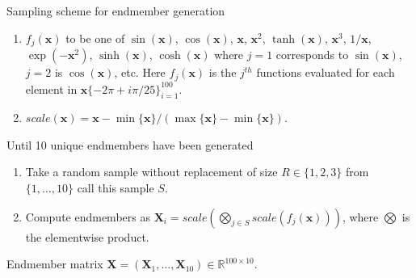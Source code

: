 \documentclass{article}
\numberwithin{equation}{section}
\theoremstyle{plain}
\begin{document}
\begin{algorithm}[tb]
   \caption{Sampling scheme for endmember generation}
   \label{ALG:EGEN}
\begin{algorithmic} 
   \begin{enumerate}
     \item  $f_j(\mathbf{x})$ to be one of $\sin(\mathbf{x})$,
     $\cos(\mathbf{x})$, $\mathbf{x}$, $\mathbf{x}^2$, $\tanh(\mathbf{x})$, $\mathbf{x}^3$, $1/\mathbf{x}$, $\exp(-\mathbf{x}^2)$, $\sinh(\mathbf{x})$,
   $\cosh(\mathbf{x})$ where $j=1$ corresponds to $\sin(\mathbf{x})$, $j=2$ is
   $\cos(\mathbf{x})$, etc. Here  $f_j(\mathbf{x})$
   is the $j^{th}$ functions evaluated for each element in $\mathbf{x}\{-2\pi +
   i\pi/25 \}_{i=1}^{100}$.
   \item  $scale(\mathbf{x}) = \mathbf{x} -
   \min\{\mathbf{x}\}/(\max\{\mathbf{x}\} - \min\{\mathbf{x}\}).$
   \end{enumerate} 
    Until 10 unique endmembers have been generated
   \begin{enumerate}
\item Take a random sample without replacement of size $R \in \{1,2,3\}$ from
$\{1,\ldots,10\}$ call this sample $S$.
\item Compute endmembers as $\mathbf{X}_i = scale\left(\bigotimes_{j \in S}
scale(f_j(\mathbf{x}))\right)$, where $\bigotimes$ is the elementwise
product. 
\end{enumerate}
    Endmember matrix $\mathbf{X} = (\mathbf{X}_1,
   \ldots, \mathbf{X}_{10}) \in \mathbb{R}^{100 \times 10}$.
\end{algorithmic}
\end{algorithm}
\end{document}
